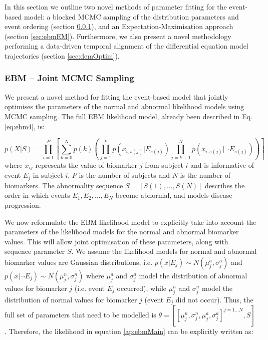In this section we outline two novel methods of parameter fitting for the event-based model: a blocked MCMC sampling of the distribution parameters and event ordering (section \ref{sec:simultSampling}), and an Expectation-Maximisation approach (section \ref{sec:ebmEM}). Furthermore, we also present a novel methodology performing a data-driven temporal alignment of the differential equation model trajectories (section \ref{sec:demOptim}). 

\subsubsection{EBM -- Joint MCMC Sampling}
\label{sec:simultSampling}

We present a novel method for fitting the event-based model that jointly optimises the parameters of the normal and abnormal likelihood models using MCMC sampling. The full EBM likelihood model, already been described in Eq. \ref{eq:ebm4}, is:

\begin{equation}
\label{ap:ebmMain}
 p(X|S) = \prod_{i=1}^P \left[ \sum_{k=0}^N p(k) \left( \prod_{j=1}^k p\left(x_{i,s(j)} | E_{s(j)} \right) \prod_{j=k+1}^N p\left(x_{i,s(j)} | \neg E_{s(j)}\right) \right) \right]
\end{equation}
where $x_{ij}$ represents the value of biomarker $j$ from subject $i$  and is informative of event $E_j$ in subject $i$, $P$ is the number of subjects and $N$ is the number of biomarkers. The abnormality sequence $S = [S(1), \dots, S(N)]$ describes the order in which events $E_1, E_2, \dots , E_N$ become abnormal, and models disease progression. 

We now reformulate the EBM likelihood model to explicitly take into account the parameters of the likelihood models for the normal and abnormal biomarker values. This will allow joint optimisation of these parameters, along with sequence parameter $S$. We assume the likelihood models for normal and abnormal biomarker values are Gaussian distributions, i.e. $p(x|E_j) \sim N(\mu^a_j, \sigma^a_j)$ and $p(x|\neg E_j) \sim N(\mu^n_j, \sigma^n_j)$ where $\mu^a_j$ and $\sigma^a_j$ model the distribution of abnormal values for biomarker $j$ (i.e. event $E_j$ occurred), while $\mu^n_j$ and $\sigma^n_j$ model the distribution of normal values for biomarker $j$ (event $E_j$ did not occur). Thus, the full set of parameters that need to be modelled is $\theta = \left[ [\mu^n_j, \sigma^n_j, \mu^a_j, \sigma^a_j]^{j=1 \dots N}, S \right]$. Therefore, the likelihood in equation \ref{ap:ebmMain} can be explicitly written as:


